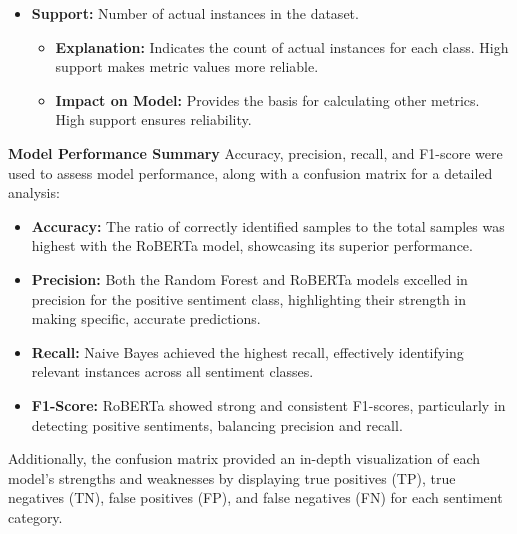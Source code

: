 \documentclass[journal]{IEEEtran}
\begin{document}
\begin{itemize}
    \item \textbf{Support:} Number of actual instances in the dataset.
    \begin{itemize}
        \item \textbf{Explanation:} Indicates the count of actual instances for each class. High support makes metric values more reliable.
        \item \textbf{Impact on Model:} Provides the basis for calculating other metrics. High support ensures reliability.
    \end{itemize}
\end{itemize}


\textbf{Model Performance Summary}
Accuracy, precision, recall, and F1-score were used to assess model performance, along with a confusion matrix for a detailed analysis:
\begin{itemize}
    \item \textbf{Accuracy:} The ratio of correctly identified samples to the total samples was highest with the RoBERTa model, showcasing its superior performance.
    \item \textbf{Precision:} Both the Random Forest and RoBERTa models excelled in precision for the positive sentiment class, highlighting their strength in making specific, accurate predictions.
    \item \textbf{Recall:} Naive Bayes achieved the highest recall, effectively identifying relevant instances across all sentiment classes.
    \item \textbf{F1-Score:} RoBERTa showed strong and consistent F1-scores, particularly in detecting positive sentiments, balancing precision and recall.
\end{itemize}

Additionally, the confusion matrix provided an in-depth visualization of each model's strengths and weaknesses by displaying true positives (TP), true negatives (TN), false positives (FP), and false negatives (FN) for each sentiment category.
\end{document}
